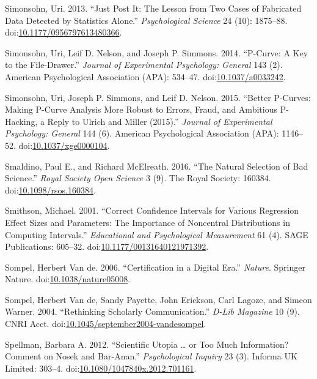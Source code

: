 \documentclass[a5paper]{book}
\begin{document}
\hypertarget{ref-doi:10.1177ux2f0956797613480366}{}
Simonsohn, Uri. 2013. ``Just Post It: The Lesson from Two Cases of
Fabricated Data Detected by Statistics Alone.'' \emph{Psychological
Science} 24 (10): 1875--88.
doi:\href{https://doi.org/10.1177/0956797613480366}{10.1177/0956797613480366}.

\hypertarget{ref-doi:10.1037ux2fa0033242}{}
Simonsohn, Uri, Leif D. Nelson, and Joseph P. Simmons. 2014. ``P-Curve:
A Key to the File-Drawer.'' \emph{Journal of Experimental Psychology:
General} 143 (2). American Psychological Association (APA): 534--47.
doi:\href{https://doi.org/10.1037/a0033242}{10.1037/a0033242}.

\hypertarget{ref-doi:10.1037ux2fxge0000104}{}
Simonsohn, Uri, Joseph P. Simmons, and Leif D. Nelson. 2015. ``Better
P-Curves: Making P-Curve Analysis More Robust to Errors, Fraud, and
Ambitious P-Hacking, a Reply to Ulrich and Miller (2015).''
\emph{Journal of Experimental Psychology: General} 144 (6). American
Psychological Association (APA): 1146--52.
doi:\href{https://doi.org/10.1037/xge0000104}{10.1037/xge0000104}.

\hypertarget{ref-doi:10.1098ux2frsos.160384}{}
Smaldino, Paul E., and Richard McElreath. 2016. ``The Natural Selection
of Bad Science.'' \emph{Royal Society Open Science} 3 (9). The Royal
Society: 160384.
doi:\href{https://doi.org/10.1098/rsos.160384}{10.1098/rsos.160384}.

\hypertarget{ref-doi:10.1177ux2f00131640121971392}{}
Smithson, Michael. 2001. ``Correct Confidence Intervals for Various
Regression Effect Sizes and Parameters: The Importance of Noncentral
Distributions in Computing Intervals.'' \emph{Educational and
Psychological Measurement} 61 (4). SAGE Publications: 605--32.
doi:\href{https://doi.org/10.1177/00131640121971392}{10.1177/00131640121971392}.

\hypertarget{ref-doi:10.1038ux2fnature05008}{}
Sompel, Herbert Van de. 2006. ``Certification in a Digital Era.''
\emph{Nature}. Springer Nature.
doi:\href{https://doi.org/10.1038/nature05008}{10.1038/nature05008}.

\hypertarget{ref-doi:10.1045ux2fseptember2004-vandesompel}{}
Sompel, Herbert Van de, Sandy Payette, John Erickson, Carl Lagoze, and
Simeon Warner. 2004. ``Rethinking Scholarly Communication.'' \emph{D-Lib
Magazine} 10 (9). CNRI Acct.
doi:\href{https://doi.org/10.1045/september2004-vandesompel}{10.1045/september2004-vandesompel}.

\hypertarget{ref-doi:10.1080ux2f1047840X.2012.701161}{}
Spellman, Barbara A. 2012. ``Scientific Utopia \ldots{} or Too Much
Information? Comment on Nosek and Bar-Anan.'' \emph{Psychological
Inquiry} 23 (3). Informa UK Limited: 303--4.
doi:\href{https://doi.org/10.1080/1047840x.2012.701161}{10.1080/1047840x.2012.701161}.
\end{document}
